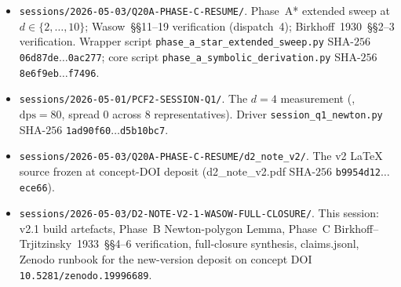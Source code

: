 \documentclass[11pt,reqno]{amsart}
\theoremstyle{plain}
\theoremstyle{definition}
\theoremstyle{remark}
\newcommand{\dps}{\mathrm{dps}}
\begin{document}
\begin{itemize}[leftmargin=2.2em]
\item
\texttt{sessions/2026-05-03/Q20A-PHASE-C-RESUME/}.
Phase~A* extended sweep at $d \in \{2,\ldots,10\}$;
Wasow~\S\S11--19 verification (dispatch~4);
Birkhoff~1930~\S\S2--3 verification.
Wrapper script
\texttt{phase\_a\_star\_extended\_sweep.py}
SHA-$256$ \texttt{06d87de$\dots$0ac277};
core script
\texttt{phase\_a\_symbolic\_derivation.py}
SHA-$256$ \texttt{8e6f9eb$\dots$f7496}.

\item
\texttt{sessions/2026-05-01/PCF2-SESSION-Q1/}.
The $d = 4$ measurement
(, $\dps = 80$, spread $0$ across
$8$ representatives). Driver
\texttt{session\_q1\_newton.py} SHA-$256$
\texttt{1ad90f60$\dots$d5b10bc7}.

\item
\texttt{sessions/2026-05-03/Q20A-PHASE-C-RESUME/d2\_note\_v2/}.
The v2 LaTeX source frozen at concept-DOI deposit
(d2\_note\_v2.pdf SHA-$256$
\texttt{b9954d12$\dots$ece66}).

\item
\texttt{sessions/2026-05-03/D2-NOTE-V2-1-WASOW-FULL-CLOSURE/}.
This session: v2.1 build artefacts, Phase~B Newton-polygon
Lemma, Phase~C Birkhoff--Trjitzinsky~1933~\S\S4--6
verification, full-closure synthesis, claims.jsonl,
Zenodo runbook for the new-version deposit on concept
DOI \texttt{10.5281/zenodo.19996689}.
\end{itemize}



\end{document}
